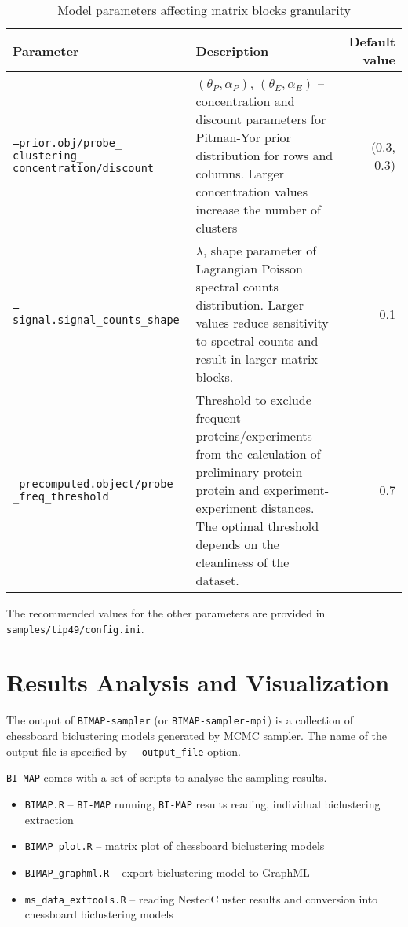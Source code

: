 \documentclass[microtype,a4paper,article,10pt,oneside,final]{memoir}
\newcommand{\bimap}{\texttt{BI-MAP}\xspace}
\begin{document}
\begin{table}[h]
\caption{Model parameters affecting matrix blocks granularity}

\begin{tabular}{p{}p{}r}
Parameter & Description & Default value \\
\hline

{\scriptsize\texttt{--prior.obj/probe\_ clustering\_ concentration/discount}}
& $(\theta_P, \alpha_P)$, $(\theta_E, \alpha_E)$ --
concentration and discount parameters for 
Pitman-Yor prior distribution for rows and columns.
Larger concentration values increase the number of clusters & (0.3, 0.3)
\\
{\scriptsize\texttt{--signal.signal\_counts\_shape}}
& $\lambda$, shape parameter of Lagrangian Poisson spectral counts distribution.
Larger values reduce sensitivity to spectral counts and result in larger matrix blocks.
& 0.1
\\
{\scriptsize\texttt{--precomputed.object/probe \_freq\_threshold}} &
Threshold to exclude frequent proteins/experiments
from the calculation of preliminary protein-protein and
experiment-experiment distances.
The optimal threshold depends on the cleanliness of the dataset.
& 0.7
\end{tabular}
\end{table}

The recommended values for the other parameters are provided in \texttt{samples/tip49/config.ini}.

\section{Results Analysis and Visualization}

The output of \texttt{BIMAP-sampler} (or \texttt{BIMAP-sampler-mpi})
is a collection of chessboard biclustering models generated by MCMC sampler.
The name of the output file is specified by \verb|--output_file| option.

\bimap comes with a set of scripts to analyse the sampling results.
\begin{itemize}
  \item \texttt{BIMAP.R} -- \bimap running, \bimap results reading,
individual biclustering extraction
  \item \texttt{BIMAP\_plot.R} -- matrix plot of chessboard biclustering models
  \item \texttt{BIMAP\_graphml.R} -- export biclustering model to GraphML
  \item \texttt{ms\_data\_exttools.R} -- reading NestedCluster results and conversion into chessboard biclustering models
\end{itemize}
\end{document}
